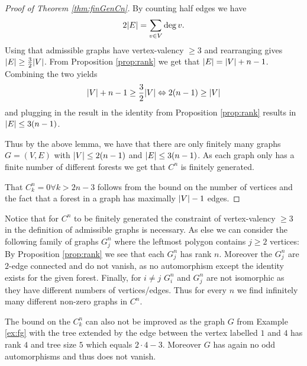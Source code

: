 \begin{proof}[Proof of Theorem \ref{thm:finGenCn}]
	By counting half edges we have
	\[
		2 \abs{E} = \sum_{v \in V} \deg{v}
	.\] 
	Using that admissible graphs have vertex-valency $\geq 3$ and rearranging gives $\abs{E} \geq \frac{3}{2} \abs{V}$.
	From Proposition \ref{prop:rank} we get that $\abs{E} = \abs{V} + n-1$.
	Combining the two yields
	\[
		\abs{V} + n -1 \geq \frac{3}{2} \abs{V} \Leftrightarrow 2 (n-1) \geq \abs{V}
	\] 
	and plugging in the result in the identity from Proposition \ref{prop:rank} results in $\abs{E} \leq 3 (n-1)$.

	Thus by the above lemma, we have that there are only finitely many graphs $G = (V,E)$ with $\abs{V} \leq 2 (n-1)$ and $\abs{E} \leq 3(n-1)$.
	As each graph only has a finite number of different forests we get that $C^{n}$ is finitely generated.

	That $C_{k}^{n} = 0 \forall k > 2n -3$ follows from the bound on the number of vertices and the fact that a forest in a graph has maximally $\abs{V} - 1$ edges.
\end{proof}

\begin{remark}
	Notice that for $C^{n}$ to be finitely generated the constraint of vertex-valency $\geq 3$ in the definition of admissible graphs is necessary.
	As else we can consider the following family of graphs $G^{n}_{j}$ where the leftmost polygon contains $j \geq 2$ vertices:
	By Proposition \ref{prop:rank} we see that each $G^{n}_{j}$ has rank $n$.
	Moreover the  $G_{j}^{n}$ are $2$-edge connected and do not vanish, as no automorphism except the identity exists for the given forest. 
	Finally, for $i\neq j$ $G^{n}_{i}$ and $G^{n}_{j}$ are not isomorphic as they have different numbers of vertices/edges.
	Thus for every $n$ we find infinitely many different non-zero graphs in $C^{n}$.
\end{remark}

\begin{remark}
	The bound on the $C_{k}^{n}$ can also not be improved as the graph $G$ from Example \ref{ex:fg} with the tree extended by the edge between the vertex labelled $1$ and $4$ has rank $4$ and
	tree size $5$ which equals $2 \cdot 4 - 3$. Moreover $G$ has again no odd automorphisms and thus does not vanish.
\end{remark}

